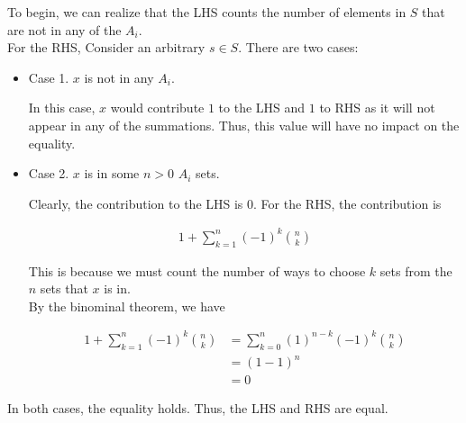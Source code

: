 \documentclass{report}
\begin{document}

\begin{subproof}
    To begin, we can realize that the LHS counts the number of elements in $S$
    that are not in any of the $A_i$. \\

    For the RHS, Consider an arbitrary $s \in S$. There are two cases:

    \begin{itemize}
        \item Case 1. $x$ is not in any $A_i$.

              In this case, $x$ would contribute $1$ to the LHS and $1$ to
              RHS as it will not appear in any of the summations. Thus, this
              value will have no impact on the equality.

        \item Case 2. $x$ is in some $n > 0$ $A_i$ sets.

              Clearly, the contribution to the LHS is $0$. For the RHS,
              the contribution is

              \begin{align*}
                  1 + \sum_{k=1}^{n}(-1)^{k} \binom{n}{k}
              \end{align*}

              This is because we must count the number of ways to choose $k$
              sets from the $n$ sets that $x$ is in. \\

              By the binominal theorem, we have

              \begin{align*}
                  1 + \sum_{k=1}^{n}(-1)^{k} \binom{n}{k} & = \sum_{k=0}^{n} (1)^{n-k}(-1)^k\binom{n}{k} \\
                                                          & = (1 - 1)^n                                  \\
                                                          & = 0
              \end{align*}

    \end{itemize}

    In both cases, the equality holds. Thus, the LHS and RHS are equal.
\end{subproof}
\end{document}

